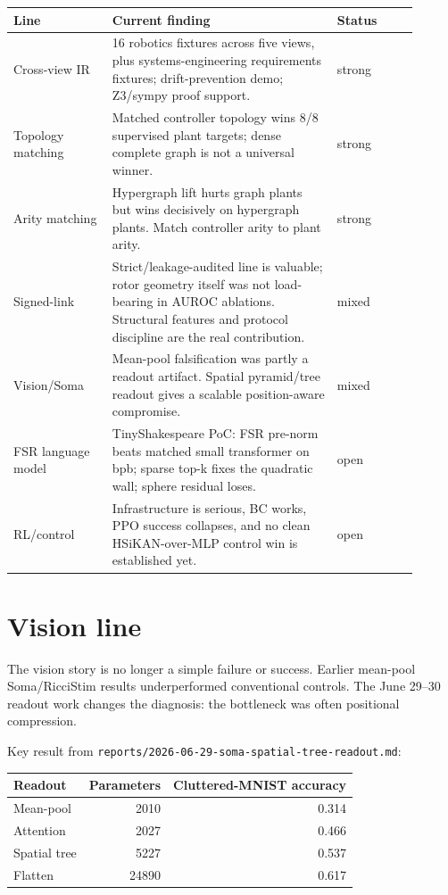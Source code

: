\documentclass[11pt]{article}
\newcommand{\pathref}[1]{\nolinkurl{#1}}
\newcommand{\good}{\textcolor{green!45!black}{strong}}
\newcommand{\mixed}{\textcolor{orange!70!black}{mixed}}
\newcommand{\open}{\textcolor{blue!60!black}{open}}
\begin{document}
\begin{table}[h]\centering\small
\begin{tabular}{p{0.22\linewidth}p{0.50\linewidth}p{0.18\linewidth}}
\toprule
Line & Current finding & Status \\
\midrule
Cross-view IR & 16 robotics fixtures across five views, plus systems-engineering
requirements fixtures; drift-prevention demo; Z3/sympy proof support. & \good \\
Topology matching & Matched controller topology wins 8/8 supervised plant
targets; dense complete graph is not a universal winner. & \good \\
Arity matching & Hypergraph lift hurts graph plants but wins decisively on
hypergraph plants. Match controller arity to plant arity. & \good \\
Signed-link & Strict/leakage-audited line is valuable; rotor geometry itself was
not load-bearing in AUROC ablations. Structural features and protocol discipline
are the real contribution. & \mixed \\
Vision/Soma & Mean-pool falsification was partly a readout artifact. Spatial
pyramid/tree readout gives a scalable position-aware compromise. & \mixed \\
FSR language model & TinyShakespeare PoC: FSR pre-norm beats matched small
transformer on bpb; sparse top-k fixes the quadratic wall; sphere residual loses. & \open \\
RL/control & Infrastructure is serious, BC works, PPO success collapses, and no
clean HSiKAN-over-MLP control win is established yet. & \open \\
\bottomrule
\end{tabular}
\end{table}

\section{Vision line}

The vision story is no longer a simple failure or success. Earlier mean-pool
Soma/RicciStim results underperformed conventional controls. The June 29--30
readout work changes the diagnosis: the bottleneck was often positional
compression.

Key result from \pathref{reports/2026-06-29-soma-spatial-tree-readout.md}:
\begin{center}\small
\begin{tabular}{lrr}
\toprule
Readout & Parameters & Cluttered-MNIST accuracy \\
\midrule
Mean-pool & 2010 & 0.314 \\
Attention & 2027 & 0.466 \\
Spatial tree & 5227 & 0.537 \\
Flatten & 24890 & 0.617 \\
\bottomrule
\end{tabular}
\end{center}
\end{document}

